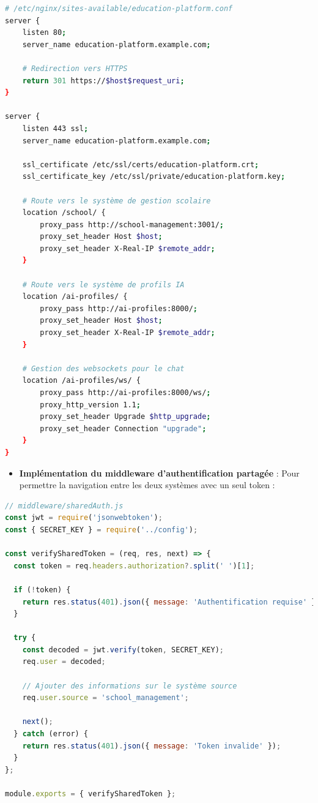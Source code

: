 \begin{lstlisting}[style=codestyle, language=bash]
# /etc/nginx/sites-available/education-platform.conf
server {
    listen 80;
    server_name education-platform.example.com;
    
    # Redirection vers HTTPS
    return 301 https://$host$request_uri;
}

server {
    listen 443 ssl;
    server_name education-platform.example.com;
    
    ssl_certificate /etc/ssl/certs/education-platform.crt;
    ssl_certificate_key /etc/ssl/private/education-platform.key;
    
    # Route vers le système de gestion scolaire
    location /school/ {
        proxy_pass http://school-management:3001/;
        proxy_set_header Host $host;
        proxy_set_header X-Real-IP $remote_addr;
    }
    
    # Route vers le système de profils IA
    location /ai-profiles/ {
        proxy_pass http://ai-profiles:8000/;
        proxy_set_header Host $host;
        proxy_set_header X-Real-IP $remote_addr;
    }
    
    # Gestion des websockets pour le chat
    location /ai-profiles/ws/ {
        proxy_pass http://ai-profiles:8000/ws/;
        proxy_http_version 1.1;
        proxy_set_header Upgrade $http_upgrade;
        proxy_set_header Connection "upgrade";
    }
}
\end{lstlisting}

\begin{itemize}
  \item \textbf{Implémentation du middleware d'authentification partagée} : Pour permettre la navigation entre les deux systèmes avec un seul token :
\end{itemize}

\begin{lstlisting}[style=codestyle, language=JavaScript]
// middleware/sharedAuth.js
const jwt = require('jsonwebtoken');
const { SECRET_KEY } = require('../config');

const verifySharedToken = (req, res, next) => {
  const token = req.headers.authorization?.split(' ')[1];
  
  if (!token) {
    return res.status(401).json({ message: 'Authentification requise' });
  }
  
  try {
    const decoded = jwt.verify(token, SECRET_KEY);
    req.user = decoded;
    
    // Ajouter des informations sur le système source
    req.user.source = 'school_management';
    
    next();
  } catch (error) {
    return res.status(401).json({ message: 'Token invalide' });
  }
};

module.exports = { verifySharedToken };
\end{lstlisting}


